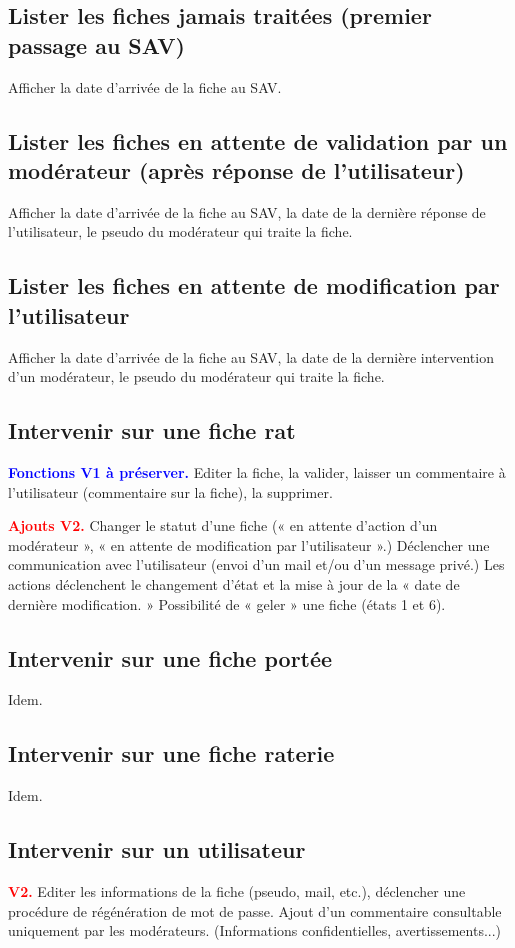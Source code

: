 ﻿\documentclass[a4paper,10pt]{article}
\newcommand\existant[1]{\noindent\textbf{\textcolor{blue}{#1}}}
\newcommand\desire[1]{\noindent\textbf{\textcolor{red}{#1}}}
\begin{document}
\subsection{Lister les fiches jamais traitées (premier passage au SAV)}
Afficher la date d'arrivée de la fiche au SAV.

\subsection{Lister les fiches en attente de validation par un modérateur (après réponse de l'utilisateur)}
Afficher la date d'arrivée de la fiche au SAV, la date de la dernière réponse de l'utilisateur, le pseudo du modérateur qui traite la fiche.

\subsection{Lister les fiches en attente de modification par l'utilisateur}
Afficher la date d'arrivée de la fiche au SAV, la date de la dernière intervention d'un modérateur, le pseudo du modérateur qui traite la fiche.

\subsection{Intervenir sur une fiche rat}
\existant{Fonctions V1 à préserver.} Editer la fiche, la valider, laisser un commentaire à l'utilisateur (commentaire sur la fiche), la supprimer.

\desire{Ajouts V2.} Changer le statut d'une fiche (« en attente d'action d'un modérateur », « en attente de modification par l'utilisateur ».) Déclencher une communication avec l'utilisateur (envoi d'un mail et/ou d'un message privé.) Les actions déclenchent le changement d'état et la mise à jour de la « date de dernière modification. »  Possibilité de « geler » une fiche (états 1 et 6).  

\subsection{Intervenir sur une fiche portée}
Idem.

\subsection{Intervenir sur une fiche raterie}
Idem.

\subsection{Intervenir sur un utilisateur}
\desire{V2.} Editer les informations de la fiche (pseudo, mail, etc.), déclencher une procédure de régénération de mot de passe. Ajout d'un commentaire consultable uniquement par les modérateurs. (Informations confidentielles, avertissements...)
\end{document}
